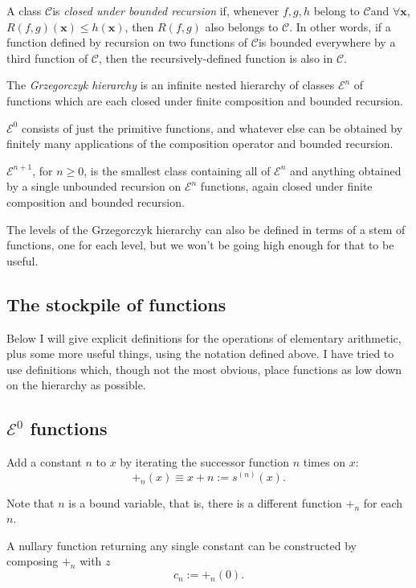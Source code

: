 \documentclass[a4paper]{article}
\newcommand{\grz}[1]{$\mathcal{E}^{#1}$}	%
\newcommand{\xvec}{\mathbf{x}}	%
\newcommand{\classC}{$\mathcal{C}$}
\theoremstyle{plain}
\theoremstyle{definition}
\begin{document}
A class \classC is {\it closed under bounded recursion} if, whenever $f,g,h$ belong to \classC and $\forall \xvec$, $R(f,g)(\xvec) \leq h(\xvec)$, then $R(f,g)$ also belongs to \classC. In other words, if a function defined by recursion on two functions of \classC is bounded everywhere by a third function of \classC, then the recursively-defined function is also in \classC.

The {\it Grzegorczyk hierarchy} is an infinite nested hierarchy of classes \grz{n} of functions which are each closed under finite composition and bounded recursion. 

\grz{0} consists of just the primitive functions, and whatever else can be obtained by finitely many applications of the composition operator and bounded recursion.

\grz{n+1}, for $n \geq 0$, is the smallest class containing all of \grz{n} and anything obtained by a single unbounded recursion on \grz{n} functions, again closed under finite composition and bounded recursion.

The levels of the Grzegorczyk hierarchy can also be defined in terms of a stem of functions, one for each level, but we won't be going high enough for that to be useful.

\subsection{The stockpile of functions}
Below I will give explicit definitions for the operations of elementary arithmetic, plus some more useful things, using the notation defined above. I have tried to use definitions which, though not the most obvious, place functions as low down on the hierarchy as possible.

\subsection{\grz{0} functions}
Add a constant $n$ to $x$ by iterating the successor function $n$ times on $x$:
\begin{equation} +_n(x) \equiv x + n := s^{(n)}(x). \end{equation}

Note that $n$ is a bound variable, that is, there is a different function $+_n$ for each $n$.

A nullary function returning any single constant can be constructed by composing $+_n$ with $z$
\begin{equation} c_n := +_n(0). \end{equation}
\end{document}
